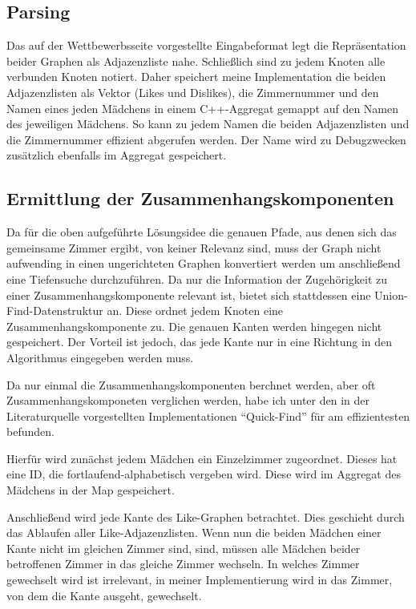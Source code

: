 \subsection{Parsing}
Das auf der Wettbewerbsseite vorgestellte Eingabeformat legt die Repräsentation beider Graphen als Adjazenzliste nahe. Schließlich sind zu jedem Knoten alle verbunden Knoten notiert.
Daher speichert meine Implementation die beiden Adjazenzlisten als Vektor (Likes und Dislikes), die Zimmernummer und den Namen eines jeden Mädchens in einem C++-Aggregat gemappt auf den Namen des jeweiligen Mädchens.
So kann zu jedem Namen die beiden Adjazenzlisten und die Zimmernummer effizient abgerufen werden. Der Name wird zu Debugzwecken zusätzlich ebenfalls im Aggregat gespeichert.

\subsection{Ermittlung der Zusammenhangskomponenten}
Da für die oben aufgeführte Lösungsidee die genauen Pfade, aus denen sich das gemeinsame Zimmer ergibt, von keiner Relevanz sind, muss der Graph nicht aufwending in einen ungerichteten Graphen konvertiert werden um anschließend eine Tiefensuche durchzuführen.
Da nur die Information der Zugehörigkeit zu einer Zusammenhangskomponente relevant ist, bietet sich stattdessen eine Union-Find-Datenstruktur\autocite[S. 238]{Sedgewick2014} an.
Diese ordnet jedem Knoten eine Zusammenhangskomponente zu. Die genauen Kanten werden hingegen nicht gespeichert.
Der Vorteil ist jedoch, das jede Kante nur in eine Richtung in den Algorithmus eingegeben werden muss.

Da nur einmal die Zusammenhangskomponenten berchnet werden, aber oft Zusammenhangskomponeten verglichen werden, habe ich unter den in der Literaturquelle vorgestellten Implementationen "`Quick-Find"'\autocite[S. 245]{Sedgewick2014} für am effizientesten befunden.

Hierfür wird zunächst jedem Mädchen ein Einzelzimmer zugeordnet. Dieses hat eine ID, die fortlaufend-alphabetisch vergeben wird. Diese wird im Aggregat des Mädchens in der Map gespeichert.

Anschließend wird jede Kante des Like-Graphen betrachtet. Dies geschieht durch das Ablaufen aller Like-Adjazenzlisten. Wenn nun die beiden Mädchen einer Kante nicht im gleichen Zimmer sind, sind, müssen alle Mädchen beider betroffenen Zimmer in das gleiche Zimmer wechseln. In welches Zimmer gewechselt wird ist irrelevant, in meiner Implementierung wird in das Zimmer, von dem die Kante ausgeht, gewechselt.


